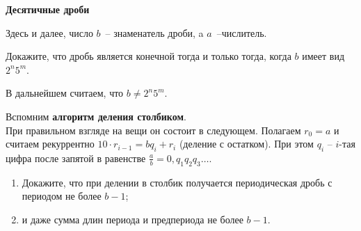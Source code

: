 \documentclass{article}
\begin{document}
    \large


    \begin{center}
        \textbf{Десятичные дроби}
    \end{center}

    Здесь и далее, число $b$~-- знаменатель дроби, a $a$~--числитель.

    \begin{enumerate_boxed}

        \item Докажите, что дробь является конечной тогда и только тогда, когда $b$ имеет вид $2^{n}5^m$.

    \end{enumerate_boxed}

    В дальнейшем считаем, что $b\neq 2^{n}5^m$.

    Вспомним \textbf{алгоритм деления столбиком}.\\
    При правильном взгляде на вещи он состоит в следующем.
    Полагаем $r_0=a$ и считаем рекуррентно $10\cdot r_{i-1}=bq_i+r_i$  (деление с остатком).
    При этом $q_i$ -- $i$-тая цифра после запятой в равенстве $\frac{a}{b}=0,q_{1}q_{2}q_3\dotsc$.

    \begin{enumerate_boxed}

        \setcounter{enumi}{1}
        \item
        \begin{enumerate}
            \item Докажите, что при делении в столбик получается периодическая дробь с периодом не более $b-1$;
            \item и даже сумма длин периода и предпериода не более $b-1$.
        \end{enumerate}

    \end{enumerate_boxed}
\end{document}
